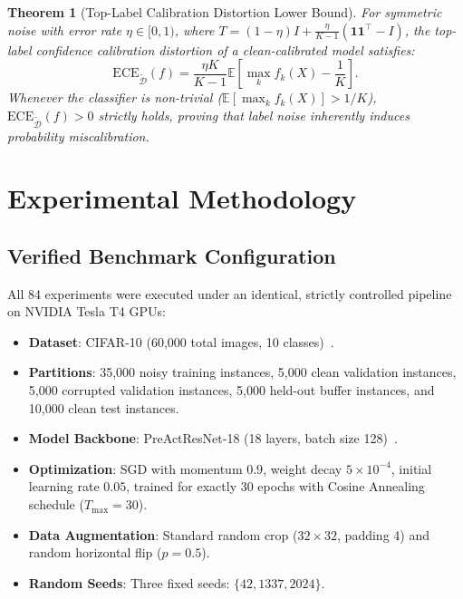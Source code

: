 \documentclass[10pt,twocolumn]{article}
\newtheorem{theorem}{Theorem}
\theoremstyle{definition}
\begin{document}
\begin{theorem}[Top-Label Calibration Distortion Lower Bound]
\label{thm:top_ece}
For symmetric noise with error rate $\eta \in [0, 1)$, where $T = (1 - \eta) I + \frac{\eta}{K - 1} (\mathbf{1}\mathbf{1}^\top - I)$, the top-label confidence calibration distortion of a clean-calibrated model satisfies:
\begin{equation}
\text{ECE}_{\tilde{\mathcal{D}}}(f) = \frac{\eta K}{K - 1} \mathbb{E} \left[ \max_{k} f_k(X) - \frac{1}{K} \right].
\end{equation}
Whenever the classifier is non-trivial ($\mathbb{E}[\max_k f_k(X)] > 1/K$), $\text{ECE}_{\tilde{\mathcal{D}}}(f) > 0$ strictly holds, proving that label noise inherently induces probability miscalibration.
\end{theorem}

\section{Experimental Methodology}

\subsection{Verified Benchmark Configuration}
All 84 experiments were executed under an identical, strictly controlled pipeline on NVIDIA Tesla T4 GPUs:
\begin{itemize}
    \item \textbf{Dataset}: CIFAR-10 (60,000 total images, 10 classes)~\cite{krizhevsky2009learning}.
    \item \textbf{Partitions}: 35,000 noisy training instances, 5,000 clean validation instances, 5,000 corrupted validation instances, 5,000 held-out buffer instances, and 10,000 clean test instances.
    \item \textbf{Model Backbone}: PreActResNet-18 (18 layers, batch size 128)~\cite{he2016identity}.
    \item \textbf{Optimization}: SGD with momentum $0.9$, weight decay $5 \times 10^{-4}$, initial learning rate $0.05$, trained for exactly 30 epochs with Cosine Annealing schedule ($T_{\max} = 30$).
    \item \textbf{Data Augmentation}: Standard random crop ($32 \times 32$, padding 4) and random horizontal flip ($p=0.5$).
    \item \textbf{Random Seeds}: Three fixed seeds: $\{42, 1337, 2024\}$.
\end{itemize}
\end{document}

